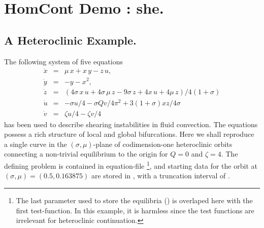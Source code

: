\documentclass[12pt]{report}
\begin{document}
\chapter{ {\cal HomCont} Demo : she.} \label{ch:HomCont_she}

\section{ A Heteroclinic Example.}
The following system of five equations 
\begin{equation} \label{sh1} \begin{array}{rcl}
\dot{x} & = & \mu \, x + x\, y - z\, u, \\
\dot{y} & = & -y - x^2, \\
\dot{z} & = & (4\sigma\, x\, u + 4\sigma\, \mu\, z -9\sigma\, z 
+ 4 x\, u + 4\mu\, z) / 4(1+\sigma)  \\
\dot{u} & = & - \sigma u / 4 - \sigma Q v / 4\pi^2
+ 3(1 + \sigma) x z / 4\sigma \\
\dot{v} & = & \zeta u / 4  - \zeta v / 4
\end{array} 
\end{equation}
has been used to describe shearing instabilities in fluid convection.
The equations possess a rich structure of local and global bifurcations.
Here we shall reproduce a single curve in the $(\sigma,\mu)$-plane
of codimension-one heteroclinic orbits connecting a non-trivial 
equilibrium to the origin for $Q=0$ and $\zeta=4$. The defining
problem is contained in equation-file 
\footnote{The last parameter used to store the equilibria () is
overlaped here with the first test-function. In this example, it is harmless since the test functions are 
irrelevant for heteroclinic continuation.}, and starting data for the orbit at 
$(\sigma,\mu)=(0.5,0.163875)$ are stored in ,
with a truncation interval of .
\end{document}
